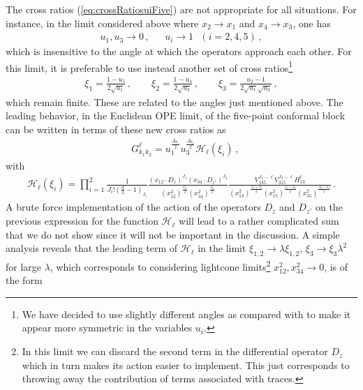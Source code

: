 The cross ratios (\ref{eq:crossRatiosuiFive}) are not appropriate for all situations.
For instance, in the limit considered above where $x_2\rightarrow x_1$ and $x_4\rightarrow x_3$, one has
\begin{align}
  u_1,u_3\rightarrow 0\,, \ \ \ \  \ \ \ u_i\rightarrow 1 \ \ \ (i=2,4,5)\,,
\end{align}
which is insensitive to the angle at which the operators approach each other.
For this limit, it is preferable to use instead another set of cross ratios\footnote{We have decided to use slightly different angles as compared with \cite{Goncalves:2019znr} to make it appear more symmetric in the variables $u_i$. }\cite{Goncalves:2019znr}
\begin{align}
  \xi_1  =\frac{1-u_5}{2 \sqrt{u_1}}                                        \,,\qquad
  \xi_2  =\frac{1-u_4}{2 \sqrt{u_3} }                               \,,     \qquad
  \xi_3  =\frac{ u_2-1}{2 \sqrt{u_1} \sqrt{u_3}}\,,
  \label{eq:anglesdef}
\end{align}
which remain finite.
These are related to the angles just mentioned above.
The leading behavior, in the Euclidean OPE limit, of the five-point conformal block can be written in terms of these new cross ratios as
\begin{align}
   & G_{k_1k_2}^{\ell} = u_1^{\frac{\Delta_{k_1}}{2}}u_3^{\frac{\Delta_{k_2}}{2}}\mathcal{H}_{\ell}(\xi_i)      \,,
\end{align}
with
\begin{align}
  \mathcal{H}_{\ell}(\xi_i)=\prod_{i=1}^2\frac{1}{J_i!\left(\frac{d}{2}-1\right)_{J_i}} \frac{(x_{12}\cdot D_{z})^{J_1}(x_{34}\cdot D_{z'})^{J_2}}{(x_{12}^2)^{\frac{J_{k_1}}{2}} (x_{34}^2)^{\frac{J_{k_2}}{2}}} \frac{V_{135}^{J_1-\ell} V_{315}^{J_2-\ell} H_{13}^{\ell}}{(x_{13}^2)^{\frac{J_1+J_3}{2}} (x_{15}^2)^{\frac{J_1-J_2}{2}} (x_{35}^2)^{\frac{J_2-J_1}{2}}   }\,.
  \label{eq:nonfactorizedH}
\end{align}
A brute force implementation of the action of the operators $D_{z}$ and $D_{z'}$ on the previous expression for the function $\mathcal{H}_{\ell}$ will lead to a rather complicated sum \cite{Goncalves:2019znr} that we do not show since it will not be important in the discussion. A simple analysis reveals that the leading term of $\mathcal{H}_\ell$ in the limit $\xi_{1,2}\rightarrow \lambda \xi_{1,2},\, \xi_3\rightarrow \xi_3\lambda^2$ for large
$\lambda$, which corresponds to considering lightcone limits\footnote{In this limit we can discard the second term in the differential operator $D_z$ which in turn makes its action easier to implement. This just corresponds to throwing away the contribution of terms associated with traces.  } $x_{12}^2,x_{34}^2\rightarrow 0$, is of the form
